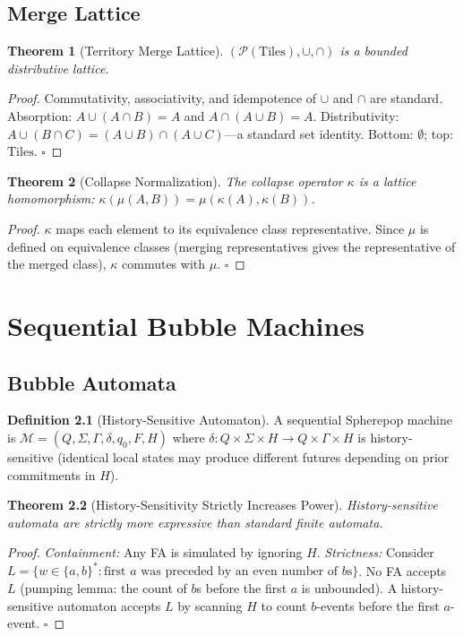 \documentclass[11pt,a4paper,openany]{book}
\theoremstyle{plain}
\newtheorem{theorem}{Theorem}[chapter]
\theoremstyle{definition}
\newtheorem{definition}[theorem]{Definition}
\theoremstyle{remark}
\begin{document}
\section{Merge Lattice}

\begin{theorem}[Territory Merge Lattice]
  $(\mathcal{P}(\mathrm{Tiles}), \cup, \cap)$ is a bounded
  distributive lattice.
\end{theorem}
\begin{proof}
  Commutativity, associativity, and idempotence of $\cup$ and $\cap$
  are standard. Absorption: $A \cup (A \cap B) = A$ and
  $A \cap (A \cup B) = A$. Distributivity:
  $A \cup (B \cap C) = (A \cup B) \cap (A \cup C)$---a standard
  set identity. Bottom: $\emptyset$; top: $\mathrm{Tiles}$. $\square$
\end{proof}

\begin{theorem}[Collapse Normalization]
  The collapse operator $\kappa$ is a lattice homomorphism:
  $\kappa(\mu(A,B)) = \mu(\kappa(A), \kappa(B))$.
\end{theorem}
\begin{proof}
  $\kappa$ maps each element to its equivalence class representative.
  Since $\mu$ is defined on equivalence classes (merging representatives
  gives the representative of the merged class), $\kappa$ commutes
  with $\mu$. $\square$
\end{proof}

\chapter{Sequential Bubble Machines}
\label{app:sequential}

\section{Bubble Automata}

\begin{definition}[History-Sensitive Automaton]
  A sequential Spherepop machine is
  $\mathcal{M} = (Q, \Sigma, \Gamma, \delta, q_0, F, H)$
  where $\delta : Q \times \Sigma \times H \to Q \times \Gamma \times H$
  is history-sensitive (identical local states may produce different
  futures depending on prior commitments in $H$).
\end{definition}

\begin{theorem}[History-Sensitivity Strictly Increases Power]
  History-sensitive automata are strictly more expressive than standard
  finite automata.
\end{theorem}
\begin{proof}
  \textit{Containment:} Any FA is simulated by ignoring $H$.
  \textit{Strictness:} Consider
  $L = \{w \in \{a,b\}^* : \text{first } a \text{ was preceded by an
  even number of } b\text{s}\}$.
  No FA accepts $L$ (pumping lemma: the count of $b$s before the first
  $a$ is unbounded). A history-sensitive automaton accepts $L$ by
  scanning $H$ to count $b$-events before the first $a$-event.
  $\square$
\end{proof}
\end{document}
